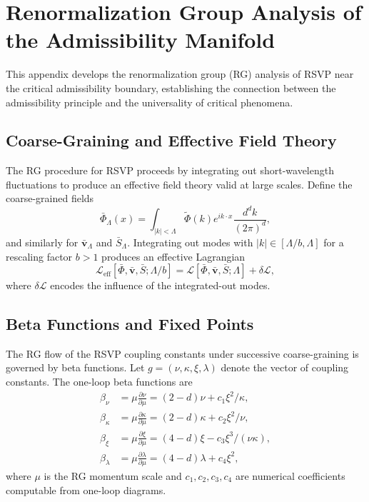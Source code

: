 \documentclass[11pt, oneside]{article}
\numberwithin{equation}{section}
\theoremstyle{rsvpstyle}
\theoremstyle{remark}
\newcommand{\vfield}{\mathbf{v}}
\begin{document}

\section{Renormalization Group Analysis of the Admissibility Manifold}
\label{app:rg}

This appendix develops the renormalization group (RG) analysis of RSVP near the
critical admissibility boundary, establishing the connection between the admissibility
principle and the universality of critical phenomena.

\subsection{Coarse-Graining and Effective Field Theory}

The RG procedure for RSVP proceeds by integrating out short-wavelength fluctuations
to produce an effective field theory valid at large scales. Define the coarse-grained
fields
\begin{equation}
  \bar\Phi_\Lambda(x) = \int_{|k| < \Lambda} \tilde\Phi(k) e^{ik\cdot x} \frac{d^d k}{(2\pi)^d},
\end{equation}
and similarly for $\bar{\vfield}_\Lambda$ and $\bar S_\Lambda$. Integrating out
modes with $|k| \in [\Lambda/b, \Lambda]$ for a rescaling factor $b > 1$ produces
an effective Lagrangian
\begin{equation}
  \mathcal{L}_\text{eff}[\bar\Phi, \bar{\vfield}, \bar S; \Lambda/b]
  = \mathcal{L}[\bar\Phi, \bar{\vfield}, \bar S; \Lambda] + \delta\mathcal{L},
\end{equation}
where $\delta\mathcal{L}$ encodes the influence of the integrated-out modes.

\subsection{Beta Functions and Fixed Points}

The RG flow of the RSVP coupling constants under successive coarse-graining is
governed by beta functions. Let $g = (\nu, \kappa, \xi, \lambda)$ denote the
vector of coupling constants. The one-loop beta functions are
\begin{align}
  \beta_\nu &= \mu \frac{\partial \nu}{\partial \mu} = (2 - d)\nu + c_1 \xi^2 / \kappa, \\
  \beta_\kappa &= \mu \frac{\partial \kappa}{\partial \mu} = (2 - d)\kappa + c_2 \xi^2 / \nu, \\
  \beta_\xi &= \mu \frac{\partial \xi}{\partial \mu} = (4 - d)\xi - c_3 \xi^3 / (\nu\kappa), \\
  \beta_\lambda &= \mu \frac{\partial \lambda}{\partial \mu} = (4-d)\lambda + c_4 \xi^2,
\end{align}
where $\mu$ is the RG momentum scale and $c_1, c_2, c_3, c_4$ are numerical
coefficients computable from one-loop diagrams.
\end{document}
